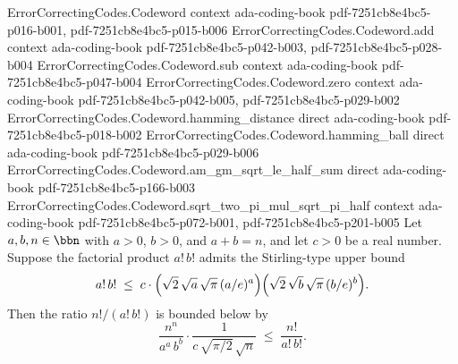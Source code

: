 \begin{lemma}
\label{ErrorCorrectingCodes.Codeword.stirling_comb_bound}
\leanok
{}
\proofstep
  {ErrorCorrectingCodes.Codeword}
  {context}
  {ada-coding-book}
  {pdf-7251cb8e4bc5-p016-b001,
    pdf-7251cb8e4bc5-p015-b006}
\proofstep
  {ErrorCorrectingCodes.Codeword.add}
  {context}
  {ada-coding-book}
  {pdf-7251cb8e4bc5-p042-b003,
    pdf-7251cb8e4bc5-p028-b004}
\proofstep
  {ErrorCorrectingCodes.Codeword.sub}
  {context}
  {ada-coding-book}
  {pdf-7251cb8e4bc5-p047-b004}
\proofstep
  {ErrorCorrectingCodes.Codeword.zero}
  {context}
  {ada-coding-book}
  {pdf-7251cb8e4bc5-p042-b005,
    pdf-7251cb8e4bc5-p029-b002}
\proofstep
  {ErrorCorrectingCodes.Codeword.hamming_distance}
  {direct}
  {ada-coding-book}
  {pdf-7251cb8e4bc5-p018-b002}
\proofstep
  {ErrorCorrectingCodes.Codeword.hamming_ball}
  {direct}
  {ada-coding-book}
  {pdf-7251cb8e4bc5-p029-b006}
\proofstep
  {ErrorCorrectingCodes.Codeword.am_gm_sqrt_le_half_sum}
  {direct}
  {ada-coding-book}
  {pdf-7251cb8e4bc5-p166-b003}
\proofstep
  {ErrorCorrectingCodes.Codeword.sqrt_two_pi_mul_sqrt_pi_half}
  {context}
  {ada-coding-book}
  {pdf-7251cb8e4bc5-p072-b001,
    pdf-7251cb8e4bc5-p201-b005}
Let $a,b,n\in\bbn$ with $a>0$, $b>0$, and $a+b=n$, and let $c>0$ be a real number.
Suppose the factorial product $a!\,b!$ admits the Stirling-type upper bound
\[
a!\,b! \;\le\;
c\cdot\Bigl(\sqrt{2}\,\sqrt{a}\,\sqrt{\pi}\,(a/e)^{a}\Bigr)\Bigl(\sqrt{2}\,\sqrt{b}\,\sqrt{\pi}\,(b/e)^{b}\Bigr).
\]
Then the ratio $n!/(a!\,b!)$ is bounded below by
\[
\frac{n^{n}}{a^{a}\,b^{b}}\cdot\frac{1}{c\,\sqrt{\pi/2}\,\sqrt{n}}
\;\le\;
\frac{n!}{a!\,b!}.
\]
\end{lemma}
